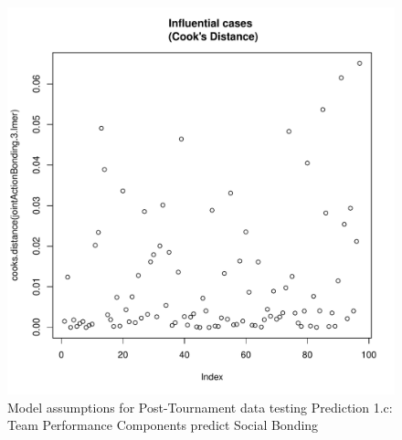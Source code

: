 \begin{CJK}{UTF8}{gbsn}
\begin{figure}[htbp]
              \includegraphics[scale =.4]{images/MLM3aCooksD.pdf}
              \caption{Model assumptions for Post-Tournament data testing Prediction 1.c: Team Performance Components predict Social Bonding}
              \label{fig:MLM3aAssumptions}
            \end{figure}



\end{CJK}
